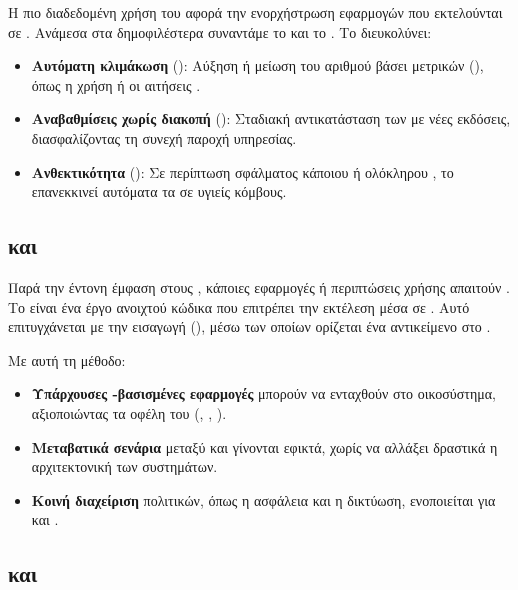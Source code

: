 Η πιο διαδεδομένη χρήση του  αφορά την ενορχήστρωση εφαρμογών που εκτελούνται σε . Ανάμεσα στα δημοφιλέστερα  συναντάμε το  και το . Το  διευκολύνει:
\begin{itemize}
    \item \textbf{Αυτόματη κλιμάκωση} (): Αύξηση ή μείωση του αριθμού  βάσει μετρικών (), όπως η χρήση  ή οι αιτήσεις .
    \item \textbf{Αναβαθμίσεις χωρίς διακοπή} (): Σταδιακή αντικατάσταση των  με νέες εκδόσεις, διασφαλίζοντας τη συνεχή παροχή υπηρεσίας.
    \item \textbf{Ανθεκτικότητα} (): Σε περίπτωση σφάλματος κάποιου  ή ολόκληρου , το  επανεκκινεί αυτόματα τα  σε υγιείς κόμβους.
\end{itemize}

\subsection{ και }

Παρά την έντονη έμφαση στους , κάποιες εφαρμογές ή περιπτώσεις χρήσης απαιτούν . Το  είναι ένα έργο ανοιχτού κώδικα που επιτρέπει την εκτέλεση  μέσα σε . Αυτό επιτυγχάνεται με την εισαγωγή  (), μέσω των οποίων ορίζεται ένα  αντικείμενο στο  . 

Με αυτή τη μέθοδο:
\begin{itemize}
    \item \textbf{Υπάρχουσες -βασισμένες εφαρμογές} μπορούν να ενταχθούν στο  οικοσύστημα, αξιοποιώντας τα οφέλη του (, , ).
    \item \textbf{Μεταβατικά σενάρια} μεταξύ  και  γίνονται εφικτά, χωρίς να αλλάξει δραστικά η αρχιτεκτονική των συστημάτων.
    \item \textbf{Κοινή διαχείριση} πολιτικών, όπως η ασφάλεια και η δικτύωση, ενοποιείται για  και .
\end{itemize}

\subsection{ και }

